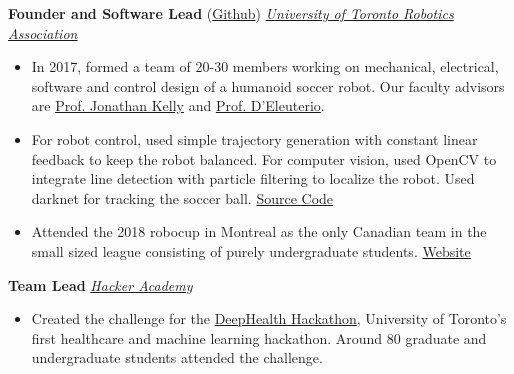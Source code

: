 \documentclass[10pt, a4paper]{cv}
\begin{document}
	\textbf{Founder and Software Lead} (\href{https://github.com/utra-robosoccer/soccer_ws} {Github}) \hfill \emph{\href{http://www.utrahumanoid.ca}{University of Toronto Robotics Association}}
	\begin{itemize}
		\item In 2017, formed a team of 20-30 members working on mechanical, electrical, software and control design of a humanoid soccer robot. Our faculty advisors are \href{http://stars.utias.utoronto.ca/~jkelly/}{Prof. Jonathan Kelly} and \href{http://www.utias.utoronto.ca/research/space-robotics/}{Prof. D’Eleuterio}.
		\item For robot control, used simple trajectory generation with constant linear feedback to keep the robot balanced. For computer vision, used OpenCV to integrate line detection with particle filtering to localize the robot. Used darknet for tracking the soccer ball. \href{https://github.com/utra-robosoccer/soccer_ws}{Source Code}
		\item Attended the 2018 robocup in Montreal as the only Canadian team in the small sized league consisting of purely undergraduate students. \href{http://utrahumanoid.ca}{Website}
	\end{itemize}
	
	\textbf{Team Lead} \hfill \emph{\href{http://hackeracademy.org}{Hacker Academy}}
	\begin{itemize}
		\item Created the challenge for the \href{https://www.facebook.com/groups/1126158850825448/}{DeepHealth Hackathon}, University of Toronto's first healthcare and machine learning hackathon. Around 80 graduate and undergraduate students attended the challenge.
	\end{itemize}
\end{document}

